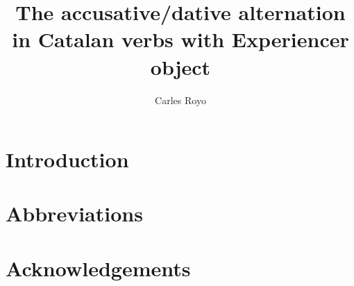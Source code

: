\documentclass[output=paper,modfonts,nonflat]{langsci/langscibook}
\author{Carles Royo\affiliation{}}
\title{The accusative/dative alternation in Catalan verbs with Experiencer object}
\begin{document}
\section{Introduction}  
 
\section*{Abbreviations}
\section*{Acknowledgements}

\sloppy
\printbibliography[heading=subbibliography,notkeyword=this] 
\end{document}
